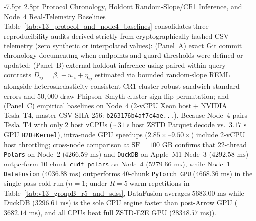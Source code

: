 \documentclass[10pt,a4paper]{article}
\makeatletter
\renewcommand\subsection{\@startsection{subsection}{2}{\z@}%
  {-7.5pt \@plus -2pt \@minus -1pt}%
  {2.8pt \@plus 1pt}%
  {\normalfont\normalsize\bfseries}}
\makeatother
\begin{document}
\subsection{Protocol Chronology, Holdout Random-Slope/CR1 Inference, and Node~4 Real-Telemetry Baselines}
\label{subsec:v13_forensic_closure}
Table~\ref{tab:v13_protocol_and_node4_baselines} consolidates three reproducibility audits derived strictly from cryptographically hashed CSV telemetry (zero synthetic or interpolated values): (Panel~A) exact Git commit chronology documenting when endpoints and guard thresholds were defined or updated; (Panel~B) external holdout inference using paired within-query contrasts $D_{ij} = \beta_1 + u_{1i} + \eta_{ij}$ estimated via bounded random-slope REML alongside heteroskedasticity-consistent CR1 cluster-robust sandwich standard errors and $50{,}000$-draw Phipson--Smyth cluster sign-flip permutation; and (Panel~C) empirical baselines on Node~4 (2-vCPU Xeon host + NVIDIA Tesla~T4, master CSV SHA-256: \texttt{b263176b4af7c4ae...}). Because Node~4 pairs Tesla~T4 with only $2$ host vCPUs ($\sim 31\text{ s}$ host ZSTD Parquet decode vs.\ $3.17\text{ s}$ GPU \texttt{H2D+Kernel}), intra-node GPU speedups ($2.85\times\text{--}9.50\times$) include 2-vCPU host throttling; cross-node comparison at $\text{SF}=100\text{ GB}$ confirms that 22-thread \texttt{Polars} on Node~2 ($4266.59\text{ ms}$) and \texttt{DuckDB} on Apple~M1 Node~3 ($4292.58\text{ ms}$) outperform 10-chunk \texttt{cudf-polars} on Node~4 ($5279.66\text{ ms}$), while Node~1 \texttt{DataFusion} ($4036.88\text{ ms}$) outperforms 40-chunk \texttt{PyTorch GPU} ($4668.36\text{ ms}$) in the single-pass cold run ($n=1$; under $R=5$ warm repetitions in Table~\ref{tab:v13_groupB_r5_and_sdss}, DataFusion averages $5683.00\text{ ms}$ while DuckDB ($3296.61\text{ ms}$) is the sole CPU engine faster than post-Arrow GPU ($3682.14\text{ ms}$), and all CPUs beat full ZSTD-E2E GPU ($28348.57\text{ ms}$)).
\end{document}
